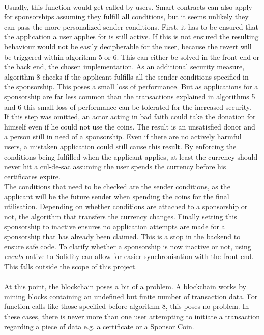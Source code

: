 \\
Usually, this function would get called by users. Smart contracts can also apply for sponsorships assuming they fulfill all conditions, but it seems unlikely they can pass the more personalized sender conditions. First, it has to be ensured that the application a user applies for is still active. If this is not ensured the resulting behaviour would not be easily decipherable for the user, because the revert will be triggered within algorithm 5 or 6. This can either be solved in the front end or the back end, the chosen implementation. As an additional security measure, algorithm 8 checks if the applicant fulfills all the sender conditions specified in the sponsorship. This poses a small loss of performance. But as applications for a sponsorship are far less common than the transactions explained in algorithms 5 and 6 this small loss of performance can be tolerated for the increased security.\\
If this step was omitted, an actor acting in bad faith could take the donation for himself even if he could not use the coins. The result is an unsatisfied donor and a person still in need of a sponsorship. Even if there are no actively harmful users, a mistaken application could still cause this result. By enforcing the conditions being fulfilled when the applicant applies, at least the currency should never hit a cul-de-sac assuming the user spends the currency before his certificates expire.\\
The conditions that need to be checked are the sender conditions, as the applicant will be the future sender when spending the coins for the final utilisation. Depending on whether conditions are attached to a sponsorship or not, the algorithm that transfers the currency changes. Finally setting this sponsorship to inactive ensures no application attempts are made for a sponsorship that has already been claimed. This is a stop in the backend to ensure safe code. To clarify whether a sponsorship is now inactive or not, using \emph{events} native to Solidity can allow for easier synchronisation with the front end. This falls outside the scope of this project.\\
\\
At this point, the blockchain poses a bit of a problem. A blockchain works by mining blocks containing an undefined but finite number of transaction data. For function calls like those specified before algorithm 8, this poses no problem. In these cases, there is never more than one user attempting to initiate a transaction regarding a piece of data e.g. a certificate or a Sponsor Coin.\\
